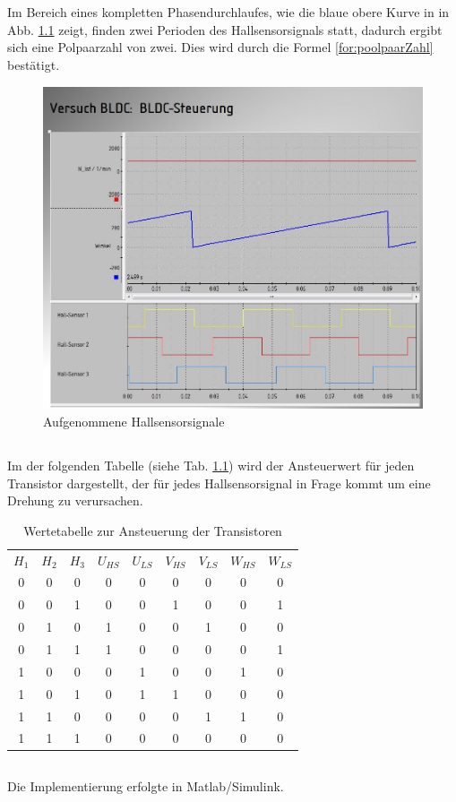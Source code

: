\chapter{}\label{ex:aufg4}
%
\section{}\label{sec:aufg4a}
Im Bereich eines kompletten Phasendurchlaufes, wie die blaue obere Kurve in in Abb. \ref{fig:aufgenommen_hallSensorSig} zeigt, finden zwei Perioden des Hallsensorsignals statt, dadurch ergibt sich eine Polpaarzahl von zwei. Dies wird durch die Formel \ref{for:poolpaarZahl} best\"atigt.
\begin{figure}[htb]
	\includegraphics[width = \textwidth]{./Bilder/bldc_aufgenommenSig}
	\caption{Aufgenommene Hallsensorsignale}
	\label{fig:aufgenommen_hallSensorSig}
\end{figure}
\newpage
\section{}\label{sec:aufg4b}
Im der folgenden Tabelle (siehe Tab. \ref{tab:T_Ansteuerung}) wird der Ansteuerwert für jeden Transistor dargestellt, der für jedes Hallsensorsignal in Frage kommt um eine Drehung zu verursachen.

\begin{table}[htb]
	\centering
\begin{tabular}{ccc||cccccc}
	$H_1$ & $H_2$ & $H_3$ & $U_{HS}$ & $U_{LS}$ & $V_{HS}$ & $V_{LS}$ & $W_{HS}$ & $W_{LS}$ \\ 
	0&0&0&0&0&0&0&0&0\\
	0&0&1&0&0&1&0&0&1\\
	0&1&0&1&0&0&1&0&0\\
	0&1&1&1&0&0&0&0&1\\
	1&0&0&0&1&0&0&1&0\\
	1&0&1&0&1&1&0&0&0\\
	1&1&0&0&0&0&1&1&0\\
	1&1&1&0&0&0&0&0&0
\end{tabular}  
\caption{Wertetabelle zur Ansteuerung der Transistoren}
\label{tab:T_Ansteuerung}
\end{table}
%
\section{}\label{sec:aufg4c}
%
Die Implementierung erfolgte in Matlab/Simulink.